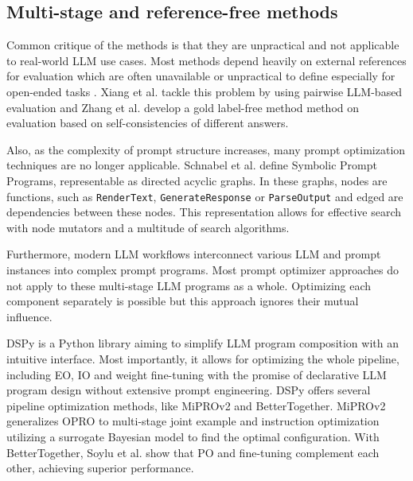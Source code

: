 \subsection{Multi-stage and reference-free methods}

Common critique of the methods is that they are unpractical and not applicable to real-world LLM use cases.
Most methods depend heavily on external references for evaluation which are often unavailable or 
unpractical to define especially for open-ended tasks \cite{xiang2025selfsupervisedpromptoptimization}.
Xiang et al.\cite{xiang2025selfsupervisedpromptoptimization} tackle this problem by using pairwise LLM-based evaluation
and Zhang et al.\cite{zhang2024glapegoldlabelagnosticprompt} develop a gold label-free method method on evaluation based
on self-consistencies of different answers.

Also, as the complexity of prompt structure increases, many prompt optimization techniques are no longer applicable\cite{schnabel2024symbolicpromptprogramsearch}.
Schnabel et al.\cite{schnabel2024symbolicpromptprogramsearch} define Symbolic Prompt Programs, representable
as directed acyclic graphs. In these graphs, nodes are functions, such as \texttt{RenderText}, \texttt{GenerateResponse} or \texttt{ParseOutput} 
and edged are dependencies between these nodes. This representation allows for effective search with node mutators
and a multitude of search algorithms.

Furthermore, modern LLM workflows interconnect various LLM and prompt instances into complex prompt programs.
Most prompt optimizer approaches do not apply to these multi-stage LLM programs\cite{opsahlong2024optimizinginstructionsdemonstrationsmultistage}
as a whole. Optimizing each component separately is possible but this approach ignores their mutual influence.

DSPy\cite{khattab2023dspycompilingdeclarativelanguage} is a Python library aiming to simplify LLM program composition with 
an intuitive interface. Most importantly, it allows for optimizing the whole pipeline, including EO, IO and weight fine-tuning
with the promise of declarative LLM program design without extensive prompt engineering. DSPy offers several pipeline optimization
methods, like MiPROv2\cite{opsahlong2024optimizinginstructionsdemonstrationsmultistage} and BetterTogether\cite{soylu2024finetuningpromptoptimizationgreat}.
MiPROv2 generalizes OPRO\cite{yang2024largelanguagemodelsoptimizers} to multi-stage joint example and instruction optimization
utilizing a surrogate Bayesian model to find the optimal configuration. With BetterTogether, Soylu et al. show that PO and fine-tuning
complement each other, achieving superior performance.

